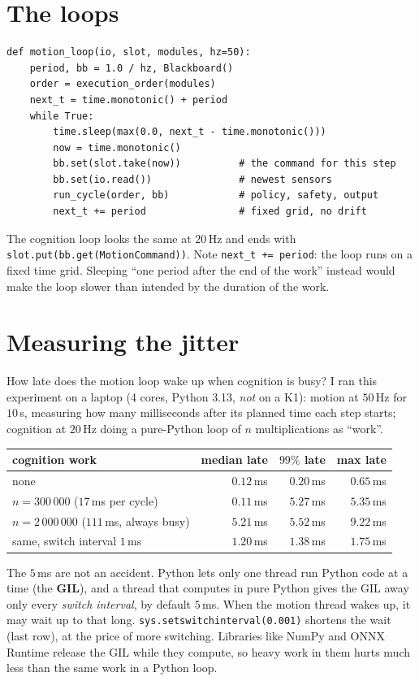 \section*{The loops}
\begin{verbatim}
def motion_loop(io, slot, modules, hz=50):
    period, bb = 1.0 / hz, Blackboard()
    order = execution_order(modules)
    next_t = time.monotonic() + period
    while True:
        time.sleep(max(0.0, next_t - time.monotonic()))
        now = time.monotonic()
        bb.set(slot.take(now))          # the command for this step
        bb.set(io.read())               # newest sensors
        run_cycle(order, bb)            # policy, safety, output
        next_t += period                # fixed grid, no drift
\end{verbatim}
The cognition loop looks the same at $20$\,Hz and ends with \verb!slot.put(bb.get(MotionCommand))!. Note \verb!next_t += period!: the loop runs on a fixed time grid. Sleeping ``one period after the end of the work'' instead would make the loop slower than intended by the duration of the work.

\section*{Measuring the jitter}
How late does the motion loop wake up when cognition is busy? I ran this experiment on a laptop (4 cores, Python 3.13, \emph{not} on a K1): motion at $50$\,Hz for $10$\,s, measuring how many milliseconds after its planned time each step starts; cognition at $20$\,Hz doing a pure-Python loop of $n$ multiplications as ``work''.
\begin{center}
\small
\begin{tabular}{lrrr}
\hline
cognition work & median late & $99\%$ late & max late\\
\hline
none & $0.12$\,ms & $0.20$\,ms & $0.65$\,ms\\
$n=300\,000$ ($17$\,ms per cycle) & $0.11$\,ms & $5.27$\,ms & $5.35$\,ms\\
$n=2\,000\,000$ ($111$\,ms, always busy) & $5.21$\,ms & $5.52$\,ms & $9.22$\,ms\\
same, switch interval $1$\,ms & $1.20$\,ms & $1.38$\,ms & $1.75$\,ms\\
\hline
\end{tabular}
\end{center}
The $5$\,ms are not an accident. Python lets only one thread run Python code at a time (the \textbf{GIL}), and a thread that computes in pure Python gives the GIL away only every \emph{switch interval}, by default $5$\,ms. When the motion thread wakes up, it may wait up to that long. \verb!sys.setswitchinterval(0.001)! shortens the wait (last row), at the price of more switching. Libraries like NumPy and ONNX Runtime release the GIL while they compute, so heavy work in them hurts much less than the same work in a Python loop.

